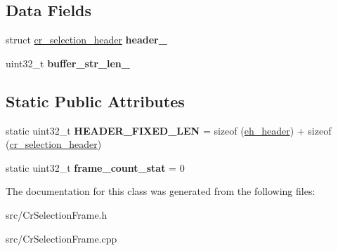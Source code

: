 \subsection*{Data Fields}
\begin{DoxyCompactItemize}
\item 
\hypertarget{classCrSelectionFrame_aaae48e7f6fe89c5c03e25c3ce8517155}{struct \hyperlink{structcr__selection__header}{cr\-\_\-selection\-\_\-header} {\bfseries header\-\_\-}}\label{classCrSelectionFrame_aaae48e7f6fe89c5c03e25c3ce8517155}

\item 
\hypertarget{classCrSelectionFrame_acc31b7bae9adc7b382e0536f98307a3a}{uint32\-\_\-t {\bfseries buffer\-\_\-str\-\_\-len\-\_\-}}\label{classCrSelectionFrame_acc31b7bae9adc7b382e0536f98307a3a}

\end{DoxyCompactItemize}
\subsection*{Static Public Attributes}
\begin{DoxyCompactItemize}
\item 
\hypertarget{classCrSelectionFrame_a0170c58a2257e86ba0f9a5ca99437ef2}{static uint32\-\_\-t {\bfseries H\-E\-A\-D\-E\-R\-\_\-\-F\-I\-X\-E\-D\-\_\-\-L\-E\-N} = sizeof (\hyperlink{structeh__header}{eh\-\_\-header}) + sizeof (\hyperlink{structcr__selection__header}{cr\-\_\-selection\-\_\-header})}\label{classCrSelectionFrame_a0170c58a2257e86ba0f9a5ca99437ef2}

\item 
\hypertarget{classCrSelectionFrame_a9d6268b45fecf79c51404ae4d367c0f3}{static uint32\-\_\-t {\bfseries frame\-\_\-count\-\_\-stat} = 0}\label{classCrSelectionFrame_a9d6268b45fecf79c51404ae4d367c0f3}

\end{DoxyCompactItemize}


The documentation for this class was generated from the following files\-:\begin{DoxyCompactItemize}
\item 
src/Cr\-Selection\-Frame.\-h\item 
src/Cr\-Selection\-Frame.\-cpp\end{DoxyCompactItemize}

